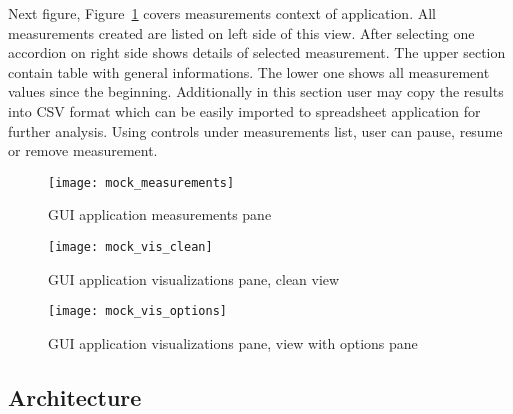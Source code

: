 Next figure, Figure~\ref{fig:mock_measurements} covers measurements context of application. All measurements created
are listed on left side of this view. After selecting one accordion on right side shows details of selected
measurement. The upper section contain table with general informations. The lower one shows all measurement values
since the beginning. Additionally in this section user may copy the results into CSV format which can be easily
imported to spreadsheet application for further analysis. Using controls under measurements list, user can
pause, resume or remove measurement.

\begin{figure}[ht]
  \centering
  \texttt{[image: mock\_measurements]}
  \caption{GUI application measurements pane}
  \label{fig:mock_measurements}
\end{figure}

\begin{figure}[ht]
  \centering
  \texttt{[image: mock\_vis\_clean]}
  \caption{GUI application visualizations pane, clean view}
  \label{fig:mock_vis_clean}
\end{figure}

\begin{figure}[ht]
  \centering
  \texttt{[image: mock\_vis\_options]}
  \caption{GUI application visualizations pane, view with options pane}
  \label{fig:mock_vis_options}
\end{figure}



\subsection{Architecture}